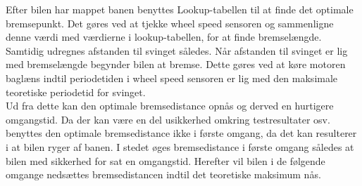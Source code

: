Efter bilen har mappet banen benyttes Lookup-tabellen til at finde det optimale bremsepunkt. Det gøres ved at tjekke wheel speed sensoren og sammenligne denne værdi med værdierne i lookup-tabellen, for at finde bremselængde. Samtidig udregnes afstanden til svinget således. Når afstanden til svinget er lig med bremselængde begynder bilen at bremse. Dette gøres ved at køre motoren baglæns indtil periodetiden i wheel speed sensoren er lig med den maksimale teoretiske periodetid for svinget. \\

Ud fra dette kan den optimale bremsedistance opnås og derved en hurtigere omgangstid. Da der kan være en del usikkerhed omkring testresultater osv. benyttes den optimale bremsedistance ikke i første omgang, da det kan resulterer i at bilen ryger af banen. I stedet øges bremsedistance i første omgang således at bilen med sikkerhed for sat en omgangstid. Herefter vil bilen i de følgende omgange nedsættes bremsedistancen indtil det teoretiske maksimum nås. \\
